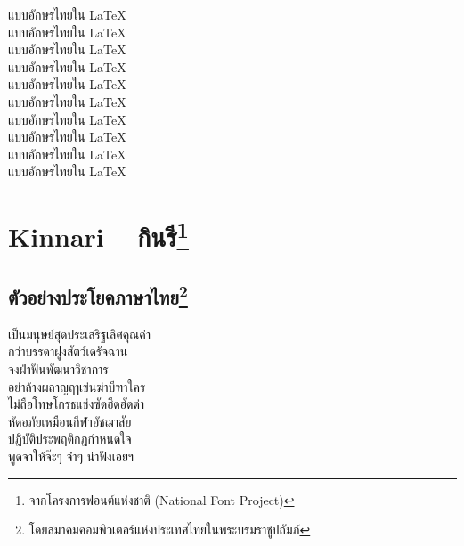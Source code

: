 \documentclass[twocolumn,a4paper]{article}
\begin{document}
\pagestyle{empty}
\vfil
\begin{figure*}
\Huge 
\hspace*{.3\textwidth}แบบอักษรไทยใน {\latintext\LaTeX}\\
\hspace*{.3\textwidth}แบบอักษรไทยใน {\latintext\LaTeX}\\
\hspace*{.3\textwidth}แบบอักษรไทยใน {\latintext\LaTeX}\\
\hspace*{.3\textwidth}แบบอักษรไทยใน {\latintext\LaTeX}\\
\hspace*{.3\textwidth}แบบอักษรไทยใน {\latintext\LaTeX}\\
\hspace*{.3\textwidth}แบบอักษรไทยใน {\latintext\LaTeX}\\
\hspace*{.3\textwidth}แบบอักษรไทยใน {\latintext\LaTeX}\\
\hspace*{.3\textwidth}แบบอักษรไทยใน {\latintext\LaTeX}\\
\hspace*{.3\textwidth}แบบอักษรไทยใน {\latintext\LaTeX}\\
\hspace*{.3\textwidth}แบบอักษรไทยใน {\latintext\LaTeX}\\
\end{figure*}
\vfil
\clearpage

\pagestyle{plain}
\section{Kinnari -- กินรี\protect\footnote{จากโครงการฟอนต์แห่งชาติ (National Font Project)}}
\subsection{ตัวอย่างประโยคภาษาไทย\protect\footnote{โดยสมาคมคอมพิวเตอร์แห่งประเทศไทยในพระบรมราชูปถัมภ์}}

เป็นมนุษย์สุดประเสริฐเลิศคุณค่า\\
กว่าบรรดาฝูงสัตว์เดรัจฉาน \\
จงฝ่าฟันพัฒนาวิชาการ \\
อย่าล้างผลาญฤๅเข่นฆ่าบีฑาใคร\\ 
ไม่ถือโทษโกรธแช่งซัดฮึดฮัดด่า \\
หัดอภัยเหมือนกีฬาอัชฌาสัย \\
ปฏิบัติประพฤติกฎกำหนดใจ \\
พูดจาให้จ๊ะๆ จ๋าๆ น่าฟังเอยฯ\\ 
\end{document}
